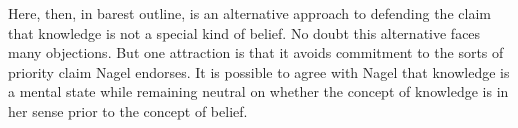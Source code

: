 \documentclass[12pt,\papersize]{extarticle}
\begin{document}
Here, then, in barest outline, is an alternative approach to defending the claim that knowledge is not a special kind of belief.
No doubt this alternative faces many objections.
But one attraction is that it avoids commitment to the sorts of priority claim Nagel endorses.
It is possible to agree with Nagel that knowledge is a mental state while remaining neutral on whether the concept of knowledge is in her sense prior to the concept of belief.






\end{document}
